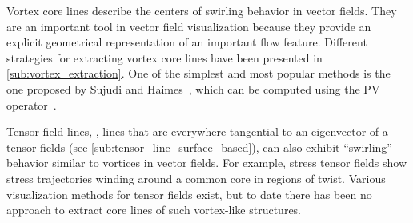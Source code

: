 Vortex core lines describe the centers of swirling behavior in vector fields.
%
They are an important tool in vector field visualization because they provide
an explicit geometrical representation of an important flow feature.
%
Different strategies for extracting vortex core lines have been presented in
\cref{sub:vortex_extraction}.
%
One of the simplest and most popular methods is the one proposed by Sujudi and
Haimes~\cite{Sujudi1995}, which can be computed using the \ac{PV}
operator~\cite{Peikert1999}.
%

%
Tensor field lines, \ie, lines that are everywhere tangential to an eigenvector
of a tensor fields (see \cref{sub:tensor_line_surface_based}), can also exhibit
``swirling'' behavior similar to vortices in vector fields.
%
For example, stress tensor fields show stress trajectories winding around a
common core in regions of twist.
%
Various visualization methods for tensor fields exist, but to date there has
been no approach to extract core lines of such vortex-like structures.
%

